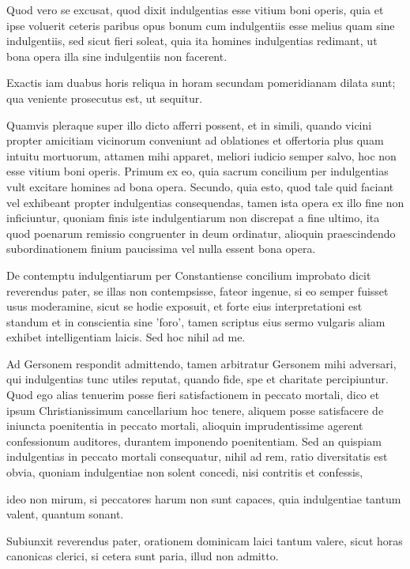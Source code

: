 \marginpar{\small[351]} Quod vero se excusat, quod dixit indulgentias esse vitium boni operis, quia et ipse voluerit ceteris paribus opus bonum cum indulgentiis esse melius quam sine indulgentiis, sed sicut fieri soleat, quia ita homines indulgentias redimant, ut bona opera illa sine indulgentiis non facerent.

Exactis iam duabus horis reliqua in horam secundam pomeridianam dilata sunt; qua veniente prosecutus est, ut sequitur.

Quamvis pleraque super illo dicto afferri possent, et in simili, quando vicini propter amicitiam vicinorum conveniunt ad oblationes et offertoria plus quam intuitu mortuorum, attamen mihi apparet, meliori iudicio semper salvo, hoc non esse vitium boni operis. Primum ex eo, quia sacrum concilium per indulgentias vult excitare homines ad bona opera. Secundo, quia esto, quod tale quid faciant vel exhibeant propter indulgentias consequendas, tamen ista opera ex illo fine non inficiuntur, quoniam finis iste indulgentiarum non discrepat a fine ultimo, ita quod poenarum remissio congruenter in deum ordinatur, alioquin praescindendo subordinationem finium paucissima vel nulla essent bona opera.

De contemptu indulgentiarum per Constantiense concilium improbato dicit reverendus pater, se illas non contempsisse, fateor ingenue, si eo semper fuisset usus moderamine, sicut se hodie exposuit, et forte eius interpretationi est standum et in conscientia sine 'foro', tamen scriptus eius sermo vulgaris aliam exhibet intelligentiam laicis. Sed hoc nihil ad me.

Ad Gersonem respondit admittendo, tamen arbitratur Gersonem mihi adversari, qui indulgentias tunc utiles reputat, quando fide, spe et charitate percipiuntur. Quod ego alias tenuerim posse fieri satisfactionem in peccato mortali, dico et ipsum Christianissimum cancellarium hoc tenere, aliquem posse satisfacere de iniuncta poenitentia in peccato mortali, alioquin imprudentissime agerent confessionum auditores, durantem imponendo poenitentiam. Sed an quispiam indulgentias in peccato mortali consequatur, nihil ad rem, ratio diversitatis est obvia, quoniam indulgentiae non solent concedi, nisi contritis et confessis,

ideo non mirum, si peccatores harum non sunt capaces, quia indulgentiae tantum valent, quantum sonant.

Subiunxit reverendus pater, orationem dominicam laici tantum valere, sicut horas canonicas clerici, si cetera sunt paria, illud non admitto.

